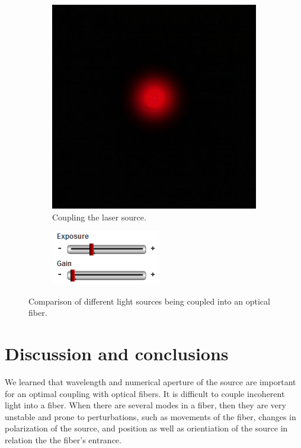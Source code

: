 \documentclass[a4paper, 12pt]{paper}
\begin{document}
\begin{figure}[H]
    \begin{subfigure}[t]{0.3\textwidth}
        \includegraphics[width=\textwidth]{img/laser_spot}
        \caption{Coupling the laser source.}
    \end{subfigure}
    \begin{subfigure}[t]{0.3\textwidth}
        \includegraphics[width=\textwidth]{img/laser}
    \end{subfigure}
    \caption{Comparison of different light sources being coupled into an optical fiber.}
\label{fig:different_sources}
\end{figure}

\section{Discussion and conclusions}

We learned that wavelength and numerical aperture of the source are important for an optimal coupling with optical fibers.
It is difficult to couple incoherent light into a fiber.
When there are several modes in a fiber, then they are very unstable and prone to perturbations, such as movements of the fiber, changes in polarization of the source, and position as well as orientiation of the source in relation the the fiber's entrance.
\end{document}
